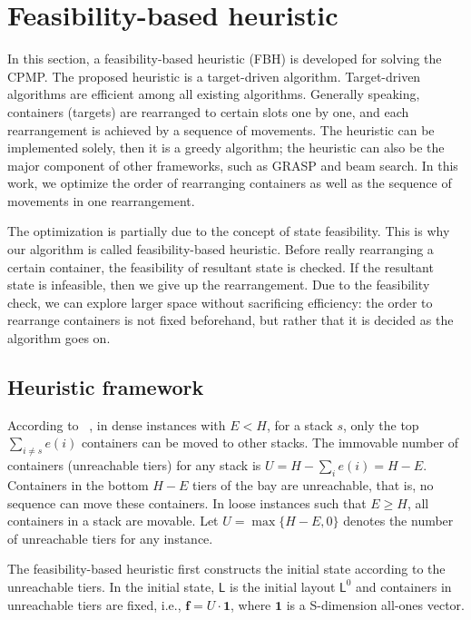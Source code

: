 \documentclass[review,3p,times,12pt,number]{elsarticle}\usepackage{amsmath}\usepackage{amssymb}
\renewcommand{\citet}[1]{\citeauthor{#1}~\citep{#1}}
\begin{document}
\section{Feasibility-based heuristic}
\label{sec:fbh}

In this section, a feasibility-based heuristic (FBH) is developed for solving the CPMP\@. The proposed heuristic is a target-driven algorithm. Target-driven algorithms \citep{exp2012,wang2015} are efficient among all existing algorithms. Generally speaking, containers (targets) are rearranged to certain slots one by one, and each rearrangement is achieved by a sequence of movements. The heuristic can be implemented solely, then it is a greedy algorithm; the heuristic can also be the major component of other frameworks, such as GRASP and beam search.
In this work, we optimize the order of rearranging containers as well as the sequence of movements in one rearrangement.

The optimization is partially due to the concept of state feasibility. This is why our algorithm is called feasibility-based heuristic.
Before really rearranging a certain container, the feasibility of resultant state is checked. If the resultant state is infeasible, then we give up the rearrangement.
Due to the feasibility check, we can explore larger space without sacrificing efficiency: the order to rearrange containers is not fixed beforehand, but rather that it is decided as the algorithm goes on.






\subsection{Heuristic framework}
According to \citet{wang2014}, in dense instances with $E<H$, for a stack $s$, only the top $\sum_{i\neq s}e(i)$ containers can be moved to other stacks. The immovable number of containers (unreachable tiers) for any stack is $U=H-\sum_ie(i)=H-E$.
Containers in the bottom $H-E$ tiers of the bay are unreachable, that is, no sequence can move these containers.
In loose instances such that $E\ge H$, all containers in a stack are movable.
Let $U=\max\{H-E,0\}$ denotes the number of unreachable tiers for any instance.


The feasibility-based heuristic first constructs the initial state according to the unreachable tiers. In the initial state, $\mathsf L$ is the initial layout $\mathsf{L}^0$ and containers in unreachable tiers are fixed, i.e., $\boldsymbol f=U\cdot\boldsymbol{1}$, where $\boldsymbol 1$ is a S-dimension all-ones vector.
\end{document}
